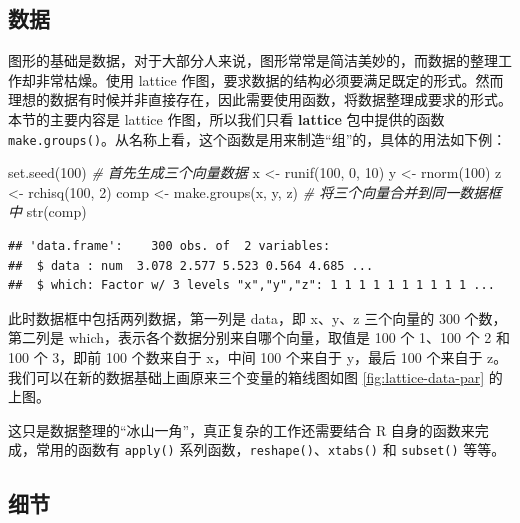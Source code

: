 \documentclass[
  b5paper,
  UTF8,twoside]{book}
\newenvironment{Shaded}{\begin{snugshade}}{\end{snugshade}}
\newcommand{\CommentTok}[1]{\textcolor[rgb]{0.56,0.35,0.01}{\textit{#1}}}
\newcommand{\DecValTok}[1]{\textcolor[rgb]{0.00,0.00,0.81}{#1}}
\newcommand{\FunctionTok}[1]{\textcolor[rgb]{0.00,0.00,0.00}{#1}}
\newcommand{\NormalTok}[1]{#1}
\newcommand{\OtherTok}[1]{\textcolor[rgb]{0.56,0.35,0.01}{#1}}
\begin{document}
\hypertarget{ux6570ux636e}{%
\subsection{数据}\label{ux6570ux636e}}

图形的基础是数据，对于大部分人来说，图形常常是简洁美妙的，而数据的整理工作却非常枯燥。使用 lattice 作图，要求数据的结构必须要满足既定的形式。然而理想的数据有时候并非直接存在，因此需要使用函数，将数据整理成要求的形式。本节的主要内容是 lattice 作图，所以我们只看 \textbf{lattice} 包中提供的函数 \texttt{make.groups()}。从名称上看，这个函数是用来制造``组''的，具体的用法如下例：

\begin{Shaded}
\begin{Highlighting}[]
\FunctionTok{set.seed}\NormalTok{(}\DecValTok{100}\NormalTok{) }\CommentTok{\# 首先生成三个向量数据}
\NormalTok{x }\OtherTok{\textless{}{-}} \FunctionTok{runif}\NormalTok{(}\DecValTok{100}\NormalTok{, }\DecValTok{0}\NormalTok{, }\DecValTok{10}\NormalTok{)}
\NormalTok{y }\OtherTok{\textless{}{-}} \FunctionTok{rnorm}\NormalTok{(}\DecValTok{100}\NormalTok{)}
\NormalTok{z }\OtherTok{\textless{}{-}} \FunctionTok{rchisq}\NormalTok{(}\DecValTok{100}\NormalTok{, }\DecValTok{2}\NormalTok{)}
\NormalTok{comp }\OtherTok{\textless{}{-}} \FunctionTok{make.groups}\NormalTok{(x, y, z) }\CommentTok{\# 将三个向量合并到同一数据框中}
\FunctionTok{str}\NormalTok{(comp)}
\end{Highlighting}
\end{Shaded}

\begin{verbatim}
## 'data.frame':    300 obs. of  2 variables:
##  $ data : num  3.078 2.577 5.523 0.564 4.685 ...
##  $ which: Factor w/ 3 levels "x","y","z": 1 1 1 1 1 1 1 1 1 1 ...
\end{verbatim}

此时数据框中包括两列数据，第一列是 data，即 x、y、z 三个向量的 300 个数，第二列是 which，表示各个数据分别来自哪个向量，取值是 100 个 1、100 个 2 和 100 个 3，即前 100 个数来自于 x，中间 100 个来自于 y，最后 100 个来自于 z。我们可以在新的数据基础上画原来三个变量的箱线图如图 \ref{fig:lattice-data-par} 的上图。

这只是数据整理的``冰山一角''，真正复杂的工作还需要结合 R 自身的函数来完成，常用的函数有 \texttt{apply()} 系列函数，\texttt{reshape()}、\texttt{xtabs()} 和 \texttt{subset()} 等等。

\hypertarget{ux7ec6ux8282}{%
\subsection{细节}\label{ux7ec6ux8282}}
\end{document}
